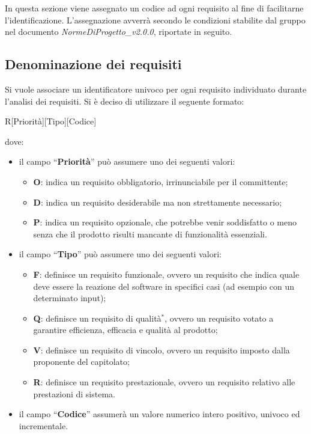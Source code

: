 In questa sezione viene assegnato un codice ad ogni requisito al fine di facilitarne l'identificazione. L'assegnazione avverrà secondo le condizioni stabilite dal gruppo nel documento \textit{NormeDiProgetto\_v2.0.0}, riportate in seguito. 
\subsection{Denominazione dei requisiti}
Si vuole associare un identificatore univoco per ogni requisito individuato durante l'analisi dei requisiti. Si \`e deciso di utilizzare il seguente formato:
  \begin{center}
    R[Priorità][Tipo][Codice]
	\end{center}
dove:
	\begin{itemize}
	\item il campo “\textbf{Priorità}” può assumere uno dei seguenti 	valori:
		\begin{itemize}
  		\item \textbf{O}: indica un requisito obbligatorio, irrinunciabile per il committente;
		\item \textbf{D}: indica un requisito desiderabile ma non strettamente necessario;
		\item \textbf{P}: indica un requisito opzionale, che potrebbe venir soddisfatto o meno senza che il prodotto risulti mancante di funzionalità essenziali.
		\end{itemize}
	\item il campo “\textbf{Tipo}” può assumere uno dei seguenti valori:
		\begin{itemize}
  		\item \textbf{F}: definisce un requisito funzionale, ovvero un requisito che indica quale deve essere la reazione del software in specifici casi (ad esempio con  un determinato input);
		\item \textbf{Q}: definisce un requisito di qualità$^*$, ovvero un requisito votato a garantire efficienza, efficacia e qualità al prodotto;
		\item \textbf{V}: definisce un requisito di vincolo, ovvero un requisito imposto dalla proponente del capitolato;
		\item \textbf{R}: definisce un requisito prestazionale, ovvero un requisito relativo alle prestazioni di sistema.
		\end{itemize}
	\item il campo “\textbf{Codice}” assumerà un valore numerico intero positivo, univoco ed incrementale.
	\end{itemize}
\newpage
